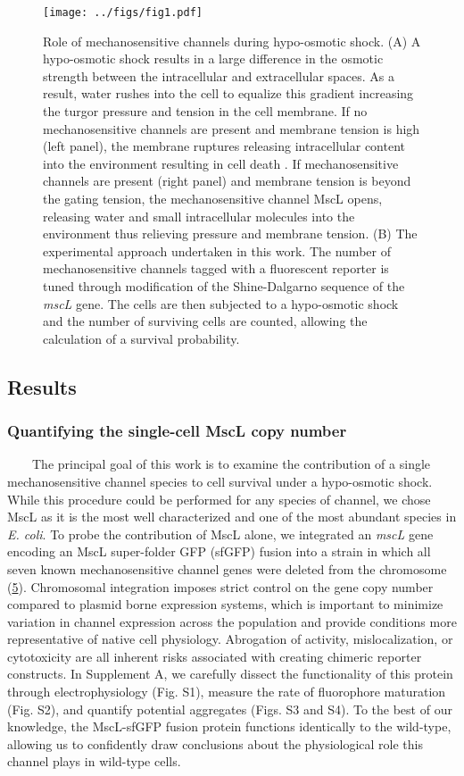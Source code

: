 \begin{figure}
\centering
\texttt{[image: ../figs/fig1.pdf]}
\caption{Role
of
mechanosensitive
channels
during
hypo-osmotic
shock.
(A) A
hypo-osmotic
shock
results
in a
large
difference
in the
osmotic
strength
between
the
intracellular
and
extracellular
spaces.
As a
result,
water
rushes
into
the
cell
to
equalize
this
gradient
increasing
the
turgor
pressure
and
tension
in the
cell
membrane.
If no
mechanosensitive
channels
are
present
and
membrane
tension
is
high
(left
panel),
the
membrane
ruptures
releasing
intracellular
content
into
the
environment
resulting
in
cell
death
. If
mechanosensitive
channels
are
present
(right
panel)
and
membrane
tension
is
beyond
the
gating
tension,
the
mechanosensitive
channel
MscL
opens,
releasing
water
and
small
intracellular
molecules
into
the
environment
thus
relieving
pressure
and
membrane
tension.
(B)
The
experimental
approach
undertaken
in
this
work.
The
number
of
mechanosensitive
channels
tagged
with a
fluorescent
reporter
is
tuned
through
modification
of the
Shine-Dalgarno
sequence
of the
\emph{mscL}
gene.
The
cells
are
then
subjected
to a
hypo-osmotic
shock
and
the
number
of
surviving
cells
are
counted,
allowing
the
calculation
of a
survival
probability.}\label{fig:overview}
\end{figure}

\subsection{Results}\label{results}

\subsubsection{Quantifying
the
single-cell
MscL
copy
number}\label{quantifying-the-single-cell-mscl-copy-number}

~~~~The
principal
goal
of
this
work
is to
examine
the
contribution
of a
single
mechanosensitive
channel
species
to
cell
survival
under
a
hypo-osmotic
shock.
While
this
procedure
could
be
performed
for
any
species
of
channel,
we
chose
MscL
as it
is the
most
well
characterized
and
one of
the
most
abundant
species
in
\emph{E.
coli}.
To
probe
the
contribution
of
MscL
alone,
we
integrated
an
\emph{mscL}
gene
encoding
an
MscL
super-folder
GFP
(sfGFP)
fusion
into a
strain
in
which
all
seven
known
mechanosensitive
channel
genes
were
deleted
from
the
chromosome
(\protect\hyperlink{ref-edwards2012}{5}).
Chromosomal
integration
imposes
strict
control
on the
gene
copy
number
compared
to
plasmid
borne
expression
systems,
which
is
important
to
minimize
variation
in
channel
expression
across
the
population
and
provide
conditions
more
representative
of
native
cell
physiology.
Abrogation
of
activity,
mislocalization,
or
cytotoxicity
are
all
inherent
risks
associated
with
creating
chimeric
reporter
constructs.
In
Supplement
A, we
carefully
dissect
the
functionality
of
this
protein
through
electrophysiology
(Fig.
S1),
measure
the
rate
of
fluorophore
maturation
(Fig.
S2),
and
quantify
potential
aggregates
(Figs.
S3 and
S4).
To the
best
of our
knowledge,
the
MscL-sfGFP
fusion
protein
functions
identically
to the
wild-type,
allowing
us to
confidently
draw
conclusions
about
the
physiological
role
this
channel
plays
in
wild-type
cells.

